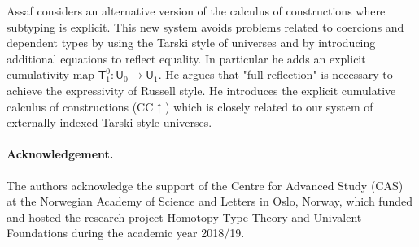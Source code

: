 \documentclass[11pt,a4paper]{article}
\def\UU{\mathsf{U}}
\newcommand{\T}{\mathsf{T}}
\begin{document}
Assaf \cite{Assaf14} considers an alternative version of the calculus of
constructions where subtyping is explicit. This new system avoids problems related to coercions and dependent types by using the Tarski style
of universes and by introducing additional equations to reflect equality. In particular he adds an explicit cumulativity map $\T^0_1 : \UU_0 \to \UU_1$. He argues that "full reflection" is necessary to achieve the expressivity of Russell style. He introduces the explicit cumulative calculus of constructions (CC$\uparrow$) which is closely related to our system of externally indexed Tarski style universes.

\paragraph{Acknowledgement.}
The authors acknowledge the support of the Centre for Advanced Study (CAS)
at the Norwegian Academy of Science and Letters
in Oslo, Norway, which funded and hosted the research project Homotopy  
Type Theory and Univalent Foundations during the academic year 2018/19.


\end{document}

